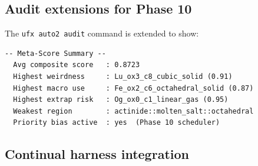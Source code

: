 \documentclass[11pt, a4paper]{article}
\begin{document}
\subsection{Audit extensions for Phase 10}

The \texttt{ufx auto2 audit} command is extended to show:

\begin{lstlisting}[language={}]
  -- Meta-Score Summary --
  Avg composite score   : 0.8723
  Highest weirdness     : Lu_ox3_c8_cubic_solid (0.91)
  Highest macro use     : Fe_ox2_c6_octahedral_solid (0.87)
  Highest extrap risk   : Og_ox0_c1_linear_gas (0.95)
  Weakest region        : actinide::molten_salt::octahedral
  Priority bias active  : yes  (Phase 10 scheduler)
\end{lstlisting}

\subsection{Continual harness integration}
\end{document}
